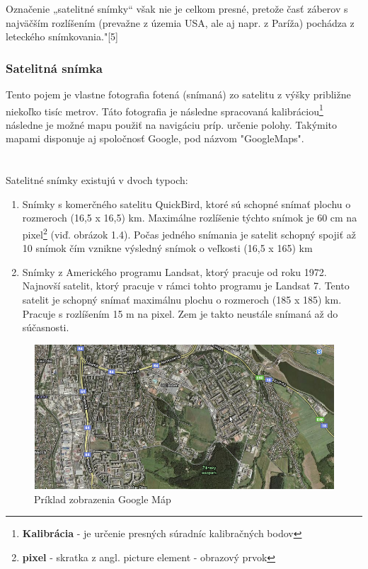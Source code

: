 Označenie „satelitné snímky“ však nie je celkom presné, pretože časť záberov s
najväčším rozlíšením (prevažne z územia USA, ale aj napr. z Paríža) pochádza z
leteckého snímkovania."[5]

\subsubsection{Satelitná snímka} 
Tento pojem je vlastne fotografia fotená (snímaná) zo satelitu z výšky približne niekoľko tisíc metrov. Táto fotografia je následne spracovaná kalibráciou\footnote{\textbf{Kalibrácia} - je určenie presných súradníc kalibračných bodov} následne je možné mapu použiť na navigáciu príp. určenie polohy. Takýmito mapami disponuje aj spoločnosť Google, pod názvom "GoogleMaps".\\\\\\

Satelitné snímky existujú v dvoch typoch:
\begin{enumerate}
\item Snímky s komerčného satelitu QuickBird, ktoré sú schopné snímať plochu o rozmeroch (16,5 x
16,5) km. Maximálne rozlíšenie týchto snímok je 60 cm na pixel\footnote{\textbf{pixel} - skratka z angl. picture element - obrazový prvok} (viď. obrázok 1.4). Počas jedného snímania je satelit schopný spojiť až 10 snímok čím vznikne výsledný snímok o veľkosti (16,5 x 165) km 

\item Snímky z Amerického programu Landsat, ktorý pracuje od roku 1972. Najnovší satelit, ktorý pracuje v rámci tohto programu je Landsat 7. Tento satelit je schopný snímať maximálnu plochu o rozmeroch (185 x 185) km. Pracuje s rozlíšením 15 m na pixel. Zem je takto neustále snímaná až do súčasnosti.
\end{enumerate}

\begin{figure}[ht]
\centering
\includegraphics[width=14.5cm]{obr/gogmaps}
\caption{Príklad zobrazenia Google Máp}
\end{figure}

